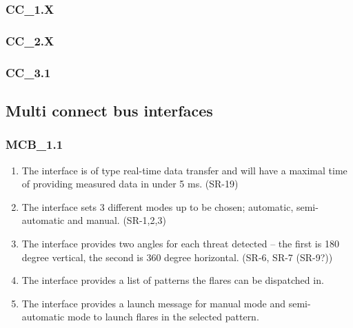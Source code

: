 \documentclass[Main]{subfiles}
\begin{document}
\subsubsection{CC\_1.X}


\subsubsection{CC\_2.X}


\subsubsection{CC\_3.1}



\subsection{Multi connect bus interfaces}

\subsubsection{MCB\_1.1}
\begin{enumerate}[4.1.3.1-1]
\setcounter{enumi}{0}

\item The interface is of type real-time data transfer and will have a maximal time of providing measured data in under 5 ms. (SR-19)

\item The interface sets 3 different modes up to be chosen; automatic, semi-automatic and manual. (SR-1,2,3)

\item The interface provides two angles for each threat detected -- the first is 180 degree vertical, the second is 360 degree horizontal. (SR-6, SR-7 (SR-9?))

\item The interface provides a list of patterns the flares can be dispatched in.

\item The interface provides a launch message for manual mode and semi-automatic mode to launch flares in the selected pattern.
\end{enumerate}

\end{document}
